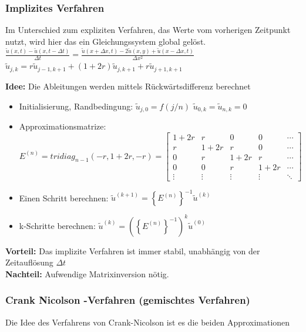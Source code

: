 \subsubsection{Implizites Verfahren}
Im Unterschied zum expliziten Verfahren, das Werte vom vorherigen Zeitpunkt nutzt, wird hier das ein Gleichungssystem global gelöst.\\

$\boxed{\frac{\tilde{u}(x,t) - \tilde{u}(x,t -\Delta t)}{\Delta t} = 
\frac{\tilde{u}(x+\Delta x, t)-2\tilde{u}(x,y) + \tilde{u}( x - \Delta x, t )} {\Delta x^2}}$\\

$ \tilde{u}_{j,k} = r \tilde{u}_{j-1,k+1} + (1+2r)\tilde{u}_{j,k+1} + r \tilde{u}_{j+1,k+1}$

\textbf{Idee:} Die Ableitungen werden mittels Rückwärtsdifferenz berechnet\\


\begin{itemize}
\item Initialisierung, Randbedingung: $\tilde{u}_{j,0}=f(j/n)$ \qquad $\tilde{u}_{0,k}=\tilde{u}_{n,k}=0$
\item Approximationsmatrize: $E^{(n)}=tridiag_{n-1}(-r,1+2r,-r)=\begin{bmatrix}
1+2r& r		& 0		& 0 	&\cdots\\
r	& 1+2r  & r		& 0		&\cdots\\
0	& r		& 1+2r 	& r 	&\cdots\\
0	& 0		& r		& 1+2r 	&\cdots\\
\vdots&	\vdots&\vdots&\vdots&\ddots	
\end{bmatrix}$ 
\item Einen Schritt berechnen: $\tilde{u}^{(k+1)}=\left\{E^{(n)}\right\}^{-1} \tilde{u}^{(k)}$
\item k-Schritte berechnen: $\tilde{u}^{(k)}=\left(\left\{E^{(n)}\right\}^{-1}\right)^k \tilde{u}^{(0)}$
\end{itemize}

\textbf{Vorteil:} Das implizite Verfahren ist immer stabil, unabhängig von der Zeitauflösung $\Delta t$\\
\textbf{Nachteil:} Aufwendige Matrixinversion nötig.

\subsubsection{Crank Nicolson -Verfahren (gemischtes Verfahren)}

Die Idee des Verfahrens von Crank-Nicolson ist es die beiden Approximationen

